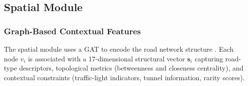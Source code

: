 \documentclass[journal]{IEEEtran}
\begin{document}
\begin{table}[!htbp]
  \centering
  \caption{Summary of LSTM branch configuration}
  \label{tab:lstm_config}
  \renewcommand{\arraystretch}{1.15}
\end{table}

\subsection{Spatial Module}

\subsubsection{Graph-Based Contextual Features}
The spatial module uses a GAT to encode the road network structure \cite{zhang_automatic_2022, li_graph_2023, zhong_multi-factor_2025}. Each node $v_i$ is associated with a 17-dimensional structural vector $\mathbf{s}_i$ capturing road-type descriptors, topological metrics (betweenness and closeness centrality), and contextual constraints (traffic-light indicators, tunnel information, rarity scores).
\end{document}
